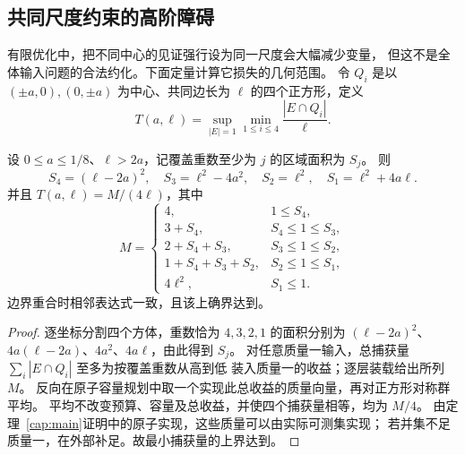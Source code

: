 \subsection{共同尺度约束的高阶障碍}\label{com:section}

有限优化中，把不同中心的见证强行设为同一尺度会大幅减少变量，
但这不是全体输入问题的合法约化。下面定量计算它损失的几何范围。
令 $Q_i$ 是以 $(\pm a,0),(0,\pm a)$ 为中心、共同边长为 $\ell$ 的四个正方形，定义
\[
 T(a,\ell)=\sup_{|E|=1}\min_{1\le i\le4}\frac{|E\cap Q_i|}{\ell}.
\]

\begin{lemma}[四轴覆盖层的精确容量]\label{com:layers}
设 $0\le a\le1/8$、$\ell>2a$，记覆盖重数至少为 $j$ 的区域面积为 $S_j$。
则
\[
 S_4=(\ell-2a)^2,\quad S_3=\ell^2-4a^2,\quad
 S_2=\ell^2,\quad S_1=\ell^2+4a\ell.
\]
并且 $T(a,\ell)=M/(4\ell)$，其中
\[
 M=\begin{cases}
 4,&1\le S_4,\\
 3+S_4,&S_4\le1\le S_3,\\
 2+S_4+S_3,&S_3\le1\le S_2,\\
 1+S_4+S_3+S_2,&S_2\le1\le S_1,\\
 4\ell^2,&S_1\le1.
 \end{cases}
\]
边界重合时相邻表达式一致，且该上确界达到。
\end{lemma}
\begin{proof}
逐坐标分割四个方体，重数恰为 $4,3,2,1$ 的面积分别为
$(\ell-2a)^2$、$4a(\ell-2a)$、$4a^2$、$4a\ell$，由此得到 $S_j$。
对任意质量一输入，总捕获量 $\sum_i|E\cap Q_i|$ 至多为按覆盖重数从高到低
装入质量一的收益；逐层装载给出所列 $M$。
反向在原子容量规划中取一个实现此总收益的质量向量，再对正方形对称群平均。
平均不改变预算、容量及总收益，并使四个捕获量相等，均为 $M/4$。
由定理~\ref{cap:main}证明中的原子实现，这些质量可以由实际可测集实现；
若并集不足质量一，在外部补足。故最小捕获量的上界达到。
\end{proof}

